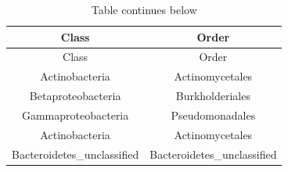 \documentclass[]{article}
\begin{document}
\begin{longtable}[]{@{}cc@{}}
\caption{Table continues below}\tabularnewline
\toprule
\begin{minipage}[b]{0.38\columnwidth}\centering\strut
Class\strut
\end{minipage} & \begin{minipage}[b]{0.38\columnwidth}\centering\strut
Order\strut
\end{minipage}\tabularnewline
\midrule
\endfirsthead
\toprule
\begin{minipage}[b]{0.38\columnwidth}\centering\strut
Class\strut
\end{minipage} & \begin{minipage}[b]{0.38\columnwidth}\centering\strut
Order\strut
\end{minipage}\tabularnewline
\midrule
\endhead
\begin{minipage}[t]{0.38\columnwidth}\centering\strut
Actinobacteria\strut
\end{minipage} & \begin{minipage}[t]{0.38\columnwidth}\centering\strut
Actinomycetales\strut
\end{minipage}\tabularnewline
\begin{minipage}[t]{0.38\columnwidth}\centering\strut
Betaproteobacteria\strut
\end{minipage} & \begin{minipage}[t]{0.38\columnwidth}\centering\strut
Burkholderiales\strut
\end{minipage}\tabularnewline
\begin{minipage}[t]{0.38\columnwidth}\centering\strut
Gammaproteobacteria\strut
\end{minipage} & \begin{minipage}[t]{0.38\columnwidth}\centering\strut
Pseudomonadales\strut
\end{minipage}\tabularnewline
\begin{minipage}[t]{0.38\columnwidth}\centering\strut
Actinobacteria\strut
\end{minipage} & \begin{minipage}[t]{0.38\columnwidth}\centering\strut
Actinomycetales\strut
\end{minipage}\tabularnewline
\begin{minipage}[t]{0.38\columnwidth}\centering\strut
Bacteroidetes\_unclassified\strut
\end{minipage} & \begin{minipage}[t]{0.38\columnwidth}\centering\strut
Bacteroidetes\_unclassified\strut

\end{minipage}
\end{longtable}
\end{document}
